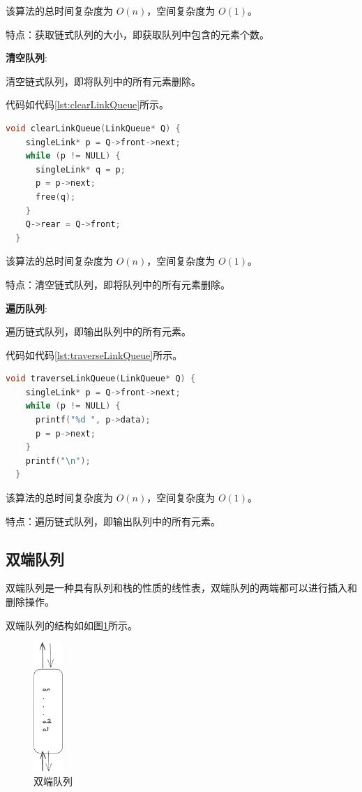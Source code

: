 \documentclass[lang=cn,newtx,10pt,scheme=chinese]{elegantbook}
\begin{document}
该算法的总时间复杂度为 $O(n)$，空间复杂度为 $O(1)$。

特点：获取链式队列的大小，即获取队列中包含的元素个数。

\textbf{清空队列}:

清空链式队列，即将队列中的所有元素删除。

代码如代码\ref{lst:clearLinkQueue}所示。

\begin{lstlisting}[language=C++, caption={清空队列示例代码}, label={lst:clearLinkQueue}]
  void clearLinkQueue(LinkQueue* Q) {
    singleLink* p = Q->front->next;
    while (p != NULL) {
      singleLink* q = p;
      p = p->next;
      free(q);
    }
    Q->rear = Q->front;
  }

\end{lstlisting}

该算法的总时间复杂度为 $O(n)$，空间复杂度为 $O(1)$。

特点：清空链式队列，即将队列中的所有元素删除。

\textbf{遍历队列}:

遍历链式队列，即输出队列中的所有元素。

代码如代码\ref{lst:traverseLinkQueue}所示。

\begin{lstlisting}[language=C++, caption={遍历队列示例代码}, label={lst:traverseLinkQueue}]
  void traverseLinkQueue(LinkQueue* Q) {
    singleLink* p = Q->front->next;
    while (p != NULL) {
      printf("%d ", p->data);
      p = p->next;
    }
    printf("\n");
  }

\end{lstlisting}

该算法的总时间复杂度为 $O(n)$，空间复杂度为 $O(1)$。

特点：遍历链式队列，即输出队列中的所有元素。





\subsection{双端队列}

双端队列是一种具有队列和栈的性质的线性表，双端队列的两端都可以进行插入和删除操作。

双端队列的结构如如图\ref{fig:deque}所示。

\begin{figure}[h]
  \centering
  \includegraphics[width=0.1\textwidth]{./figure/pdf/cropped/DQueue.pdf}
  \caption{双端队列}
  \label{fig:deque}
\end{figure}
\end{document}
